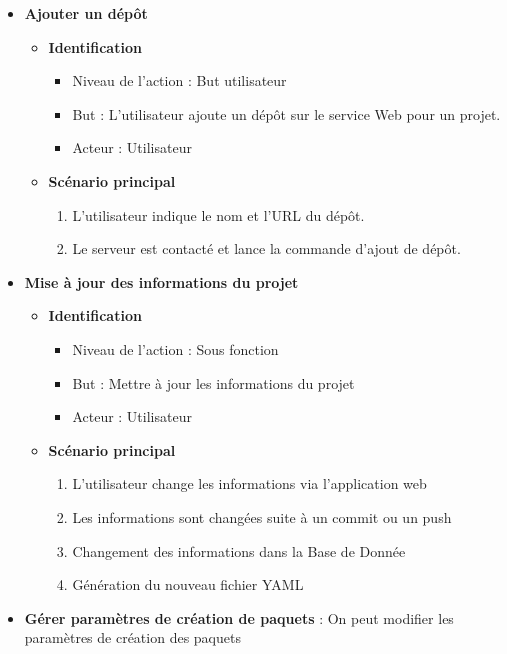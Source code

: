\documentclass[12pt,a4paper]{article}
\begin{document}
\begin{itemize}
\item\textbf{\large Ajouter un dépôt} 
  \begin{itemize} 
  \item \textbf{Identification} 
    \begin{itemize} 
    \item[] Niveau de l'action : But utilisateur 
    \item[] But : L'utilisateur ajoute un dépôt sur le service Web pour un projet.
    \item[] Acteur : Utilisateur 
    \end{itemize} 
  \item \textbf{Scénario principal} 
    \begin{enumerate}
    \item L'utilisateur indique le nom et l'URL du dépôt. 
    \item Le serveur est contacté et lance la commande d'ajout de dépôt. 
    \end{enumerate} 
  \end{itemize}
  
\item\textbf{\large Mise à jour des informations du projet}
  \begin{itemize}
  \item \textbf{Identification}
    \begin{itemize}
    \item[] Niveau de l'action : Sous fonction
    \item[] But : Mettre à jour les informations du projet
    \item[] Acteur : Utilisateur
    \end{itemize}
  \item \textbf{Scénario principal}
    \begin{enumerate}
    \item L'utilisateur change les informations via l'application web
    \item Les informations sont changées suite à un commit ou un push
    \item Changement des informations dans la Base de Donnée
    \item Génération du nouveau fichier YAML
    \end{enumerate}
  \end{itemize}
  
\item \textbf{Gérer paramètres de création de paquets} : On peut modifier les paramètres de création des paquets
  

\end{itemize}
\end{document}
